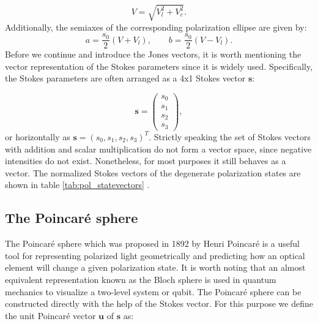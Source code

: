 \begin{equation}
    V = \sqrt{V_l^2 + V_c^2}.
\end{equation}
Additionally, the semiaxes of the corresponding polarization ellipse are given by:
\begin{equation}
    a=\frac{s_0}{2}(V+V_l), \qquad b=\frac{s_0}{2}(V-V_l).
\end{equation}
Before we continue and introduce the Jones vectors, it is worth mentioning the vector representation of the Stokes parameters since it is widely used. Specifically, the Stokes parameters are often arranged as a 4x1 Stokes vector $\bm{s}$:

\begin{equation}
    \bm{s}=
    \begin{pmatrix}
    s_0 \\
    s_1 \\
    s_2 \\
    s_3
    \end{pmatrix},
\end{equation}
or horizontally as $\bm{s}=(s_0, s_1, s_2, s_3)^T$. Strictly speaking the set of Stokes vectors with addition and scalar multiplication do not form a vector space, since negative intensities do not exist. Nonetheless, for most purposes it still behaves as a vector. The normalized Stokes vectors of the degenerate polarization states are shown in table \ref{tab:pol_statevectors} \cite{Hecht, Shurcliff1962, GilPerez2017}.

\subsection{The Poincaré sphere}
\label{sec:the_poincare_sphere}
The Poincaré sphere which was proposed in 1892 by Henri Poincaré is a useful tool for representing polarized light geometrically and predicting how an optical element will change a given polarization state. It is worth noting that an almost equivalent representation known as the Bloch sphere is used in quantum mechanics to visualize a two-level system or qubit. The Poincaré sphere can be constructed directly with the help of the Stokes vector. For this purpose we define the unit Poincaré vector $\bm{u}$ of $\bm{s}$ as:

